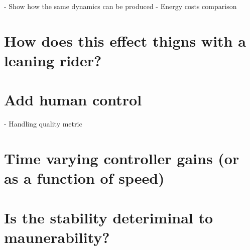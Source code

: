 \documentclass[12pt]{article}
\begin{document}
- Show how the same dynamics can be produced
- Energy costs comparison

\section{How does this effect thigns with a leaning rider?}

\section{Add human control}

- Handling quality metric

\section{Time varying controller gains (or as a function of speed)}

\section{Is the stability deteriminal to maunerability?}
\end{document}
